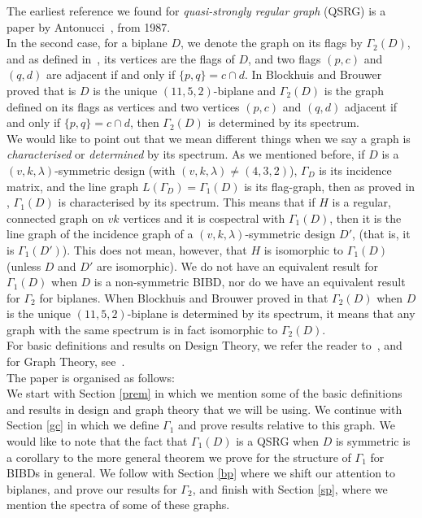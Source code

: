 \documentclass[letterpaper,10pt]{article}
\theoremstyle{plain}
\theoremstyle{definition}
\begin{document}
The earliest reference we found for {\em{quasi-strongly regular graph}} (QSRG) is a paper by Antonucci~\cite{An}, from 1987.\\

In the second case, for a biplane $D$, we denote the graph on its flags by $\Gamma_2(D)$, and as defined in~\cite{BB}, its vertices are the flags of $D$, and two flags $(p,c)$ and $(q,d)$ are adjacent if and only if $\{p,q\}=c\cap d$. In \cite{BB} Blockhuis and Brouwer proved that is $D$ is the unique $(11,5,2)$-biplane and $\Gamma_2(D)$ is the graph defined on its flags as vertices and two vertices $(p,c)$ and $(q,d)$ adjacent if and only if $\{p,q\}=c\cap d$, then $\Gamma_2(D)$ is determined by its spectrum.\\

We would like to point out that we mean different things when we say a graph is {\em{characterised}} or {\em{determined}} by its spectrum. As we mentioned before, if $D$ is a $(v,k,\lambda)$-symmetric design (with $(v,k,\lambda)\neq(4,3,2)$), $\Gamma_D$ is its incidence matrix, and the line graph $L(\Gamma_D)=\Gamma_1(D)$ is its flag-graph, then as proved in \cite{HR2}, $\Gamma_1(D)$ is characterised by its spectrum. This means that if $H$ is a regular, connected graph on $vk$ vertices and it is cospectral with $\Gamma_1(D)$, then it is the line graph of the incidence graph of a $(v,k,\lambda)$-symmetric design $D'$, (that is, it is $\Gamma_1(D')$). This does not mean, however, that $H$ is isomorphic to $\Gamma_1(D)$ (unless $D$ and $D'$ are isomorphic). We do not have an equivalent result for $\Gamma_1(D)$ when $D$ is a non-symmetric BIBD, nor do we have an equivalent result for $\Gamma_2$ for biplanes. When Blockhuis and Brouwer proved in \cite{BB} that $\Gamma_2(D)$ when $D$ is the unique $(11,5,2)$-biplane is determined by its spectrum, it means that any graph with the  same spectrum is in fact isomorphic to $\Gamma_2(D)$.\\

For basic definitions and results on Design Theory, we refer the reader to~\cite{St}, and for Graph Theory, see~\cite{GR}.\\

The paper is organised as follows:\\
We start with Section \ref{prem} in which we mention some of the basic definitions and results in design and graph theory that we will be using. We continue with Section \ref{gc} in which we define $\Gamma_1$ and prove results relative to this graph. We would like to note that the fact that $\Gamma_1(D)$ is a QSRG when $D$ is symmetric is a corollary to the more general theorem we prove for the structure of $\Gamma_1$ for BIBDs in general. We follow with Section \ref{bp} where we shift our attention to biplanes, and prove our results for $\Gamma_2$, and finish with Section \ref{sp}, where we mention the spectra of some of these graphs.
\end{document}
